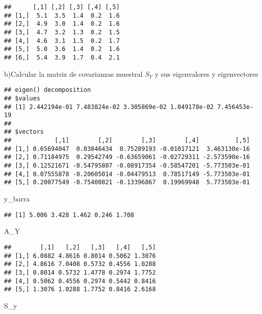 \documentclass[
]{article}
\newenvironment{Shaded}{\begin{snugshade}}{\end{snugshade}}
\newcommand{\NormalTok}[1]{#1}
\begin{document}
\begin{verbatim}
##      [,1] [,2] [,3] [,4] [,5]
## [1,]  5.1  3.5  1.4  0.2  1.6
## [2,]  4.9  3.0  1.4  0.2  1.6
## [3,]  4.7  3.2  1.3  0.2  1.5
## [4,]  4.6  3.1  1.5  0.2  1.7
## [5,]  5.0  3.6  1.4  0.2  1.6
## [6,]  5.4  3.9  1.7  0.4  2.1
\end{verbatim}

b)Calcular la matriz de covarianzas muestral \(S_Y\) y sus eigenvalores
y eigenvectores

\begin{verbatim}
## eigen() decomposition
## $values
## [1] 2.442194e-01 7.483824e-02 3.305869e-02 1.049178e-02 7.456453e-19
## 
## $vectors
##            [,1]        [,2]        [,3]        [,4]          [,5]
## [1,] 0.65694047  0.03846434  0.75289193 -0.01017121  3.463130e-16
## [2,] 0.71184975  0.29542749 -0.63659061 -0.02729311 -2.573590e-16
## [3,] 0.12521671 -0.54795807 -0.08917354 -0.58547201 -5.773503e-01
## [4,] 0.07555878 -0.20605014 -0.04479513  0.78517149 -5.773503e-01
## [5,] 0.20077549 -0.75400821 -0.13396867  0.19969948  5.773503e-01
\end{verbatim}

\begin{Shaded}
\begin{Highlighting}[]
\NormalTok{y_barra}
\end{Highlighting}
\end{Shaded}

\begin{verbatim}
## [1] 5.006 3.428 1.462 0.246 1.708
\end{verbatim}

\begin{Shaded}
\begin{Highlighting}[]
\NormalTok{A_Y}
\end{Highlighting}
\end{Shaded}

\begin{verbatim}
##        [,1]   [,2]   [,3]   [,4]   [,5]
## [1,] 6.0882 4.8616 0.8014 0.5062 1.3076
## [2,] 4.8616 7.0408 0.5732 0.4556 1.0288
## [3,] 0.8014 0.5732 1.4778 0.2974 1.7752
## [4,] 0.5062 0.4556 0.2974 0.5442 0.8416
## [5,] 1.3076 1.0288 1.7752 0.8416 2.6168
\end{verbatim}

\begin{Shaded}
\begin{Highlighting}[]
\NormalTok{S_y}
\end{Highlighting}
\end{Shaded}
\end{document}
